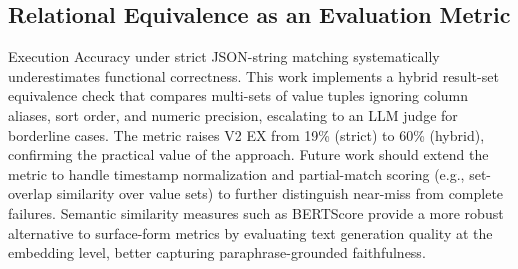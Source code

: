 \documentclass{article}
\begin{document}
\subsection{Relational Equivalence as an Evaluation Metric}

Execution Accuracy under strict JSON-string matching systematically underestimates functional correctness. This work implements a hybrid result-set equivalence check that compares multi-sets of value tuples ignoring column aliases, sort order, and numeric precision, escalating to an LLM judge for borderline cases. The metric raises V2 EX from 19\% (strict) to 60\% (hybrid), confirming the practical value of the approach. Future work should extend the metric to handle timestamp normalization and partial-match scoring (e.g., set-overlap similarity over value sets) to further distinguish near-miss from complete failures. Semantic similarity measures such as BERTScore \cite{zhang2020bertscore} provide a more robust alternative to surface-form metrics by evaluating text generation quality at the embedding level, better capturing paraphrase-grounded faithfulness.



\end{document}
